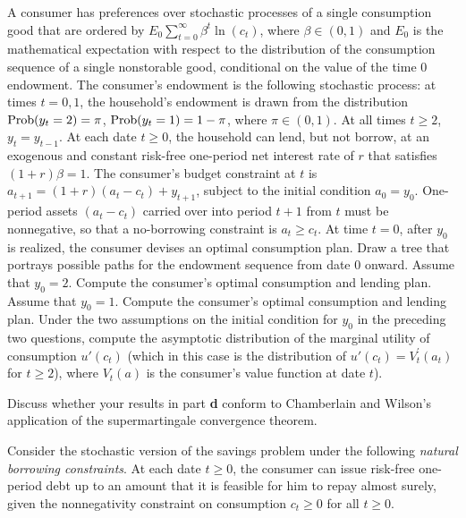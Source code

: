 \medskip

\medskip
{} \quad
A consumer has preferences over stochastic processes of a single consumption
good that are ordered by
$ E_0 \sum_{t=0}^\infty \beta^t \ln(c_t)$, where $\beta \in (0,1)$
and $E_0$ is the mathematical
expectation with respect to the distribution of the  consumption sequence
of a single nonstorable good, conditional
on the value of the time $0$ endowment.
 The consumer's  endowment is the following
stochastic process: at times $t=0,1$, the household's endowment is drawn
from the distribution
${\rm Prob}(y_t = 2)  = \pi$,
${\rm Prob}(y_t = 1)  =1 -  \pi$, where $\pi \in (0,1)$.  At all times
$t\geq 2$, $y_t =y_{t-1}$.
At each date $t \geq 0$, the household can  lend, but not borrow, at an
exogenous and constant risk-free one-period net interest rate of
$r$ that satisfies $(1+r)\beta =1$.
The consumer's budget constraint at $t$ is
$a_{t+1} = (1+r) (a_t -c_t) + y_{t+1}$, subject to the initial
condition $a_0 = y_0$.
One-period assets $(a_t -c_t)$ carried  over into period
$t+1$ from $t$ must be nonnegative, so that a no-borrowing
constraint is $a_t \geq c_t$. At time $t=0$, after $y_0$ is realized,
the consumer devises an optimal consumption plan.
\medskip
{} Draw a tree that portrays  possible paths for
the endowment sequence from date $0$ onward.
\medskip
{}  Assume that $y_0 = 2$.  Compute the consumer's optimal
consumption and lending plan.
\medskip
{}  Assume that $y_0 =1$.  Compute the consumer's optimal
consumption and lending plan.
\medskip
{}  Under the two assumptions on the initial condition
for $y_0$ in the preceding two questions,
 compute the asymptotic distribution of the marginal
utility of consumption $u'(c_t)$ (which in this case is the distribution
of $u'(c_t) = V_t^\prime(a_t)$
for $t \geq 2$),   where $V_t(a)$ is the consumer's value function
at date $t$).

\medskip
{} Discuss whether your   results in part {\bf d} conform to
Chamberlain and Wilson's application of the supermartingale convergence
theorem.

\medskip
{}  \quad
Consider the stochastic version of the savings problem
under the following {\it natural borrowing constraints\/}.   At each
date $t \geq 0$, the consumer can issue risk-free one-period debt
up to an amount   that it is feasible for him to
repay almost surely, given the nonnegativity   constraint on consumption
$c_t \geq 0$ for all $t \geq 0$.

